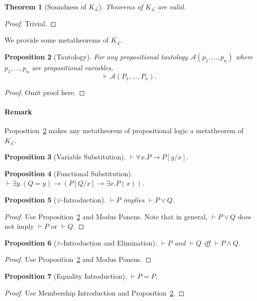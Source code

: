 \documentclass{article}
\theoremstyle{plain}
\newtheorem{thm}{Theorem}
\newtheorem{prop}[thm]{Proposition}
\begin{document}
\begin{thm}[Soundness of $K_\mathcal{L}$]
Theorems of $K_\mathcal{L}$ are valid.
\end{thm}
\begin{proof}
	Trivial.
\end{proof}

We provide some metatheorems of $K_\mathcal{L}$.

\begin{prop}[Tautology] \label{prop:taut}
	For any propositional tautology $\mathcal{A}(p_1,\dots,p_n)$ where $p_1,\dots,p_n$ are propositional variables, $$ \vdash \mathcal{A}(P_1,\dots,P_n).$$
\end{prop}
\begin{proof}
	Omit proof here.
\end{proof}
\paragraph{Remark} Proposition~\ref{prop:taut} makes any metatheorem of propositional logic a metatheorem of $K_\mathcal{L}$.
\begin{prop} [Variable Substitution]
	$\vdash \forall x . P \to P[y / x]$.
\end{prop}
\begin{prop}[Functional Substitution]
	$\vdash \exists y . (Q = y) \to (P[Q / x] \to \exists x . P(x))$.
\end{prop}
\begin{prop}[$\vee$-Introduction] \label{prop:vee-introduction}
	$\vdash P$ implies $\vdash P \vee Q$.
\end{prop}
\begin{proof}
Use Proposition~\ref{prop:taut} and Modus Ponens.
Note that in general, $\vdash P \vee Q$ does not imply $\vdash P$ or $\vdash Q$.
\end{proof}

\begin{prop}[$\wedge$-Introduction and Elimination]
\label{prop:wedge}
$\vdash P$ and $\vdash Q$ iff $\vdash P \wedge Q$.
\end{prop}
\begin{proof}
Use Proposition~\ref{prop:taut} and Modus Ponens.
\end{proof}

\begin{prop}[Equality Introduction]
	$\vdash P = P$.
\end{prop}
\begin{proof}
	Use Membership Introduction and Proposition~\ref{prop:taut}.
\end{proof}
\end{document}
